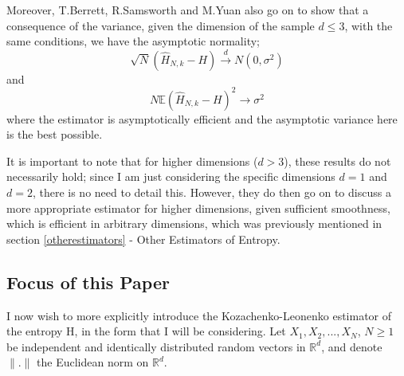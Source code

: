 \documentclass{report}
\begin{document}
Moreover, T.Berrett, R.Samsworth and M.Yuan also go on to show that a consequence of the variance, given the dimension of the sample $d \leq 3$, with the same conditions, we have the asymptotic normality;
\begin{equation}
\sqrt{N}(\hat{H}_{N, k} - H) \xrightarrow{d} N(0, \sigma^2)
\end{equation}
and 
\begin{equation} 
N \mathbb{E}{(\hat{H}_{N, k} - H)^2} \xrightarrow{} \sigma^2
\end{equation}
where the estimator is asymptotically efficient and the asymptotic variance here is the best possible.

It is important to note that for higher dimensions ($d > 3$), these results do not necessarily hold; since I am just considering the specific dimensions $d=1$ and $d=2$, there is no need to detail this. However, they do then go on to discuss a more appropriate estimator for higher dimensions, given sufficient smoothness, which is efficient in arbitrary dimensions, which was previously mentioned in section \ref{otherestimators} - Other Estimators of Entropy.




\subsection{Focus of this Paper}

I now wish to more explicitly introduce the Kozachenko-Leonenko estimator of the entropy H, in the form that I will be considering. Let $X_{1}, X_{2}, ... ,X_{N}$, $N \geq 1$ be independent and identically distributed random vectors in $\mathbb{R}^{d}$, and denote $\|.\|$ the Euclidean norm on $\mathbb{R}^{d}$.
 
\end{document}
